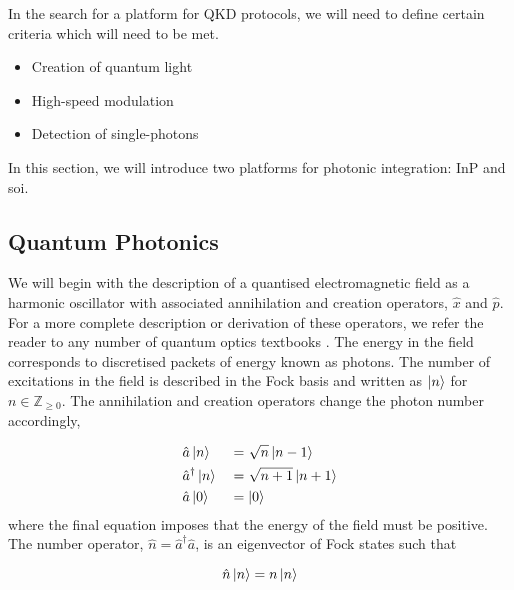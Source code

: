 In the search for a platform for \ac{QKD} protocols, we will need to define certain criteria which will need to be met.

\begin{itemize}
	\item Creation of quantum light
	\item High-speed modulation
	\item Detection of single-photons
\end{itemize}

In this section, we will introduce two platforms for photonic integration: \ac{InP} and \ac{soi}.

\subsection{Quantum Photonics}

We will begin with the description of a quantised electromagnetic field as a harmonic oscillator with associated annihilation and creation operators, $\hat{x}$ and $\hat{p}$. For a more complete description or derivation of these operators, we refer the reader to any number of quantum optics textbooks \cite{gerry2005introductory, fox2006quantum, loudon2000quantum}. The energy in the field corresponds to discretised packets of energy known as photons. The number of excitations in the field is described in the Fock basis and written as $\ket{n}$ for $n\in \mathbb{Z}_{\ge 0}$. The annihilation and creation operators change the photon number accordingly,

\begin{alignat}{2}
	&\hat{a}\ket{n} &&= \sqrt{n}\ket{n-1}\\
	&\hat{a}^\dagger \ket{n} &&= \sqrt{n+1}\ket{n+1}\\
	&\hat{a}\ket{0} && = \ket{0}
\end{alignat}
where the final equation imposes that the energy of the field must be positive. The number operator, $\hat{n} = \hat{a}^\dagger\hat{a}$, is an eigenvector of Fock states such that

\begin{equation}
	\hat{n}\ket{n} = n\ket{n}
\end{equation}



